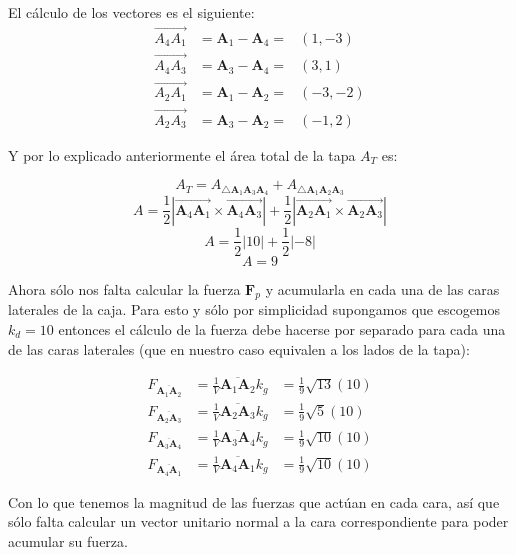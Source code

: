 El cálculo de los vectores es el siguiente:
\begin{eqnarray}
\overrightarrow{A_4 A_1} & = \textbf{A}_1 - \textbf{A}_4 = & (1, -3) \nonumber \\
\overrightarrow{A_4 A_3} & = \textbf{A}_3 - \textbf{A}_4 = & (3, 1) \nonumber \\
\overrightarrow{A_2 A_1} & = \textbf{A}_1 - \textbf{A}_2 = & (-3, -2) \nonumber \\
\overrightarrow{A_2 A_3} & = \textbf{A}_3 - \textbf{A}_2 = & (-1, 2) \nonumber
\end{eqnarray}

Y por lo explicado anteriormente el área total de la tapa $A_T$ es:

$$ A_T = A_{\bigtriangleup \textbf{A}_1 \textbf{A}_3 \textbf{A}_4} + A_{\bigtriangleup \textbf{A}_1 \textbf{A}_2 \textbf{A}_3} $$
$$ A = \frac{1}{2} | \overrightarrow{\textbf{A}_4 \textbf{A}_1} \times \overrightarrow{\textbf{A}_4 \textbf{A}_3} | + \frac{1}{2} | \overrightarrow{\textbf{A}_2 \textbf{A}_1} \times \overrightarrow{\textbf{A}_2 \textbf{A}_3} |$$
$$A = \frac{1}{2} | 10 | + \frac{1}{2} | -8 |$$
$$A = 9$$

Ahora sólo nos falta calcular la fuerza $\textbf{F}_p$ y acumularla en cada una de las caras laterales de la caja. Para esto y sólo por simplicidad supongamos que escogemos $k_d = 10$ entonces el cálculo de la fuerza debe hacerse por separado para cada una de las caras laterales (que en nuestro caso equivalen a los lados de la tapa):

\begin{eqnarray}
F_{\overline{\textbf{A}_1 \textbf{A}_2}} & =  \frac{1}{V}\overline{\textbf{A}_1 \textbf{A}_2} k_g & = \frac{1}{9} \sqrt{13} \left( 10 \right) \nonumber \\
F_{\overline{\textbf{A}_2 \textbf{A}_3}} & =  \frac{1}{V}\overline{\textbf{A}_2 \textbf{A}_3} k_g & = \frac{1}{9} \sqrt{5}  \left( 10 \right) \nonumber \\
F_{\overline{\textbf{A}_3 \textbf{A}_4}} & =  \frac{1}{V}\overline{\textbf{A}_3 \textbf{A}_4} k_g & = \frac{1}{9} \sqrt{10} \left( 10 \right) \nonumber \\
F_{\overline{\textbf{A}_4 \textbf{A}_1}} & =  \frac{1}{V}\overline{\textbf{A}_4 \textbf{A}_1} k_g & = \frac{1}{9} \sqrt{10} \left( 10 \right) \nonumber
\end{eqnarray}

Con lo que tenemos la magnitud de las fuerzas que actúan en cada cara, así que sólo falta calcular un vector unitario normal a la cara correspondiente para poder acumular su fuerza.

